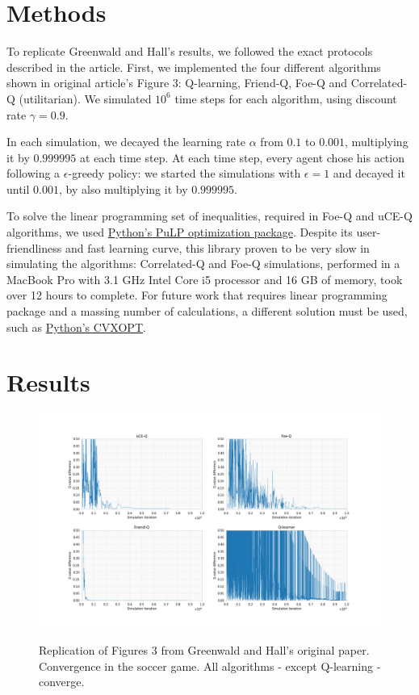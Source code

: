 \documentclass{article}
\begin{document}
    \section{Methods}
    \label{sec:methods}
    To replicate Greenwald and Hall's results, we followed the exact protocols described in the article.
    First, we implemented the four different algorithms shown in original article's Figure 3: Q-learning, Friend-Q, Foe-Q and Correlated-Q (utilitarian).
    We simulated $10^{6}$ time steps for each algorithm, using discount rate $\gamma = 0.9$.

    In each simulation, we decayed the learning rate $\alpha$ from $0.1$ to $0.001$, multiplying it by $0.999995$ at each time step.
    At each time step, every agent chose his action following a $\epsilon$-greedy policy: we started the simulations with $\epsilon = 1$ and decayed it until $0.001$, by also multiplying it by $0.999995$.

    To solve the linear programming set of inequalities, required in Foe-Q and uCE-Q algorithms, we used \href{https://pythonhosted.org/PuLP/}{Python's PuLP optimization package}.
    Despite its user-friendliness and fast learning curve, this library proven to be very slow in simulating the algorithms: Correlated-Q and Foe-Q simulations, performed in a MacBook Pro with 3.1 GHz Intel Core i5 processor and 16 GB of memory, took over 12 hours to complete.
    For future work that requires linear programming package and a massing number of calculations, a different solution must be used, such as \href{https://cvxopt.org/}{Python's CVXOPT}.

    \section{Results}
    \label{sec:results}

    \begin{figure}[t]
        \includegraphics[width=\textwidth]{./images/figure2.png}
        \centering
        \label{fig2}
        \caption{Replication of Figures 3 from Greenwald and Hall's original paper.
        Convergence in the soccer game.
        All algorithms - except Q-learning - converge.}
    \end{figure}
\end{document}
